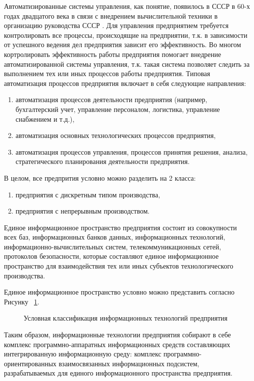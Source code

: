 Автоматизированные системы управления, как понятие, появилось в СССР в 60-х годах двадцатого века в связи с внедрением вычислительной техники в организацию руководства СССР \cite[с.~38]{Yakovenko}. Для управления предприятием требуется контролировать все процессы, происходящие на предприятии, т.к. в зависимости от успешного ведения дел предприятия зависит его эффективность. Во многом кортролировать эффективность работы предприятия помогает внедрение автоматизированной системы управления, т.к. такая система позволяет следить за выполнением тех или иных процессов работы предприятия. Типовая автоматизация процессов предприятия включает в себя следующие направления:

\begin{enumerate}
	\item автоматизация процессов деятельности предприятия (например, бухгалтерский учет, управление персоналом, логистика, управление снабжением и т.д.),
	\item автоматизация основных технологических процессов предприятия,
	\item автоматизация процессов управления, процессов принятия решения, анализа, стратегического планирования деятельности предприятия.
\end{enumerate}

В целом, все предпрития условно можно разделить на 2 класса:
\begin{enumerate}
	\item предприятия с дискретным типом производства,
	\item предприятия с непрерывным производством.
\end{enumerate}

Единое информационное пространство предприятия состоит из совокупности всех баз, информационных банков данных, информационных технологий, информационно-вычислительных систем, телекоммуникационных сетей, протоколов безопасности, которые составляют единое информационное пространство для взаимодействия тех или иных субъектов технологического производства.

Единое информационное пространство условно можно представить согласно Рисунку ~\cref{fig:ITspace}.

\begin{figure}[ht1]
    \caption{Условная классификация информационных технологий предприятия}\label{fig:ITspace}
\end{figure}
Таким  образом, информационные технологии предприятия собирают в себе комплекс программно-аппаратных информационных средств составляющих интегрированную информационную среду: комплекс программно-ориентированных взаимосвязанных информационных подсистем, разрабатываемых для единого информационного пространства предприятия.

